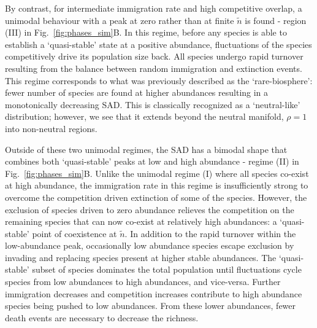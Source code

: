 \documentclass[9pt,twocolumn,twoside,lineno]{pnas-new}
\begin{document}
By contrast, for intermediate immigration rate %
and high competitive overlap, 
a unimodal behaviour with a peak at zero rather than at finite $\tilde{n}$ is found - region (III) in Fig.~\ref{fig:phases_sim}B. %
In this regime, before any species is able to establish a `quasi-stable' state at a positive abundance,  fluctuations of the species competitively drive its population size back.
All species undergo rapid turnover resulting from the balance between random immigration and extinction events. %
This regime corresponds to what was previously described as the `rare-biosphere': fewer number of species are found at higher abundances resulting in a monotonically decreasing SAD. 
This is classically recognized as a `neutral-like' distribution; however, we see that it extends beyond the neutral manifold, $\rho=1$ into non-neutral regions.
 
Outside of these two unimodal regimes, the SAD has a bimodal shape that combines both `quasi-stable' peaks at low and high abundance - regime (II) in Fig.~\ref{fig:phases_sim}B.
Unlike the unimodal regime (I) where all species co-exist at high abundance, %
the immigration rate in this regime is insufficiently strong to overcome the competition driven extinction of some of the species. %
However, the exclusion of species driven to zero abundance relieves the competition on the remaining species that can now co-exist at relatively high abundances: a `quasi-stable' point of coexistence at $\tilde{n}$. 
In addition to the rapid turnover within the low-abundance peak, occasionally low abundance species escape exclusion by invading and replacing species present at higher stable abundances. 
The `quasi-stable' subset of species dominates the total population %
until fluctuations cycle species from low abundances to high abundances, and vice-versa.
Further immigration decreases and competition increases contribute to high abundance species being pushed to low abundances. 
From these lower abundances, fewer death events are necessary to decrease the richness.
\end{document}

